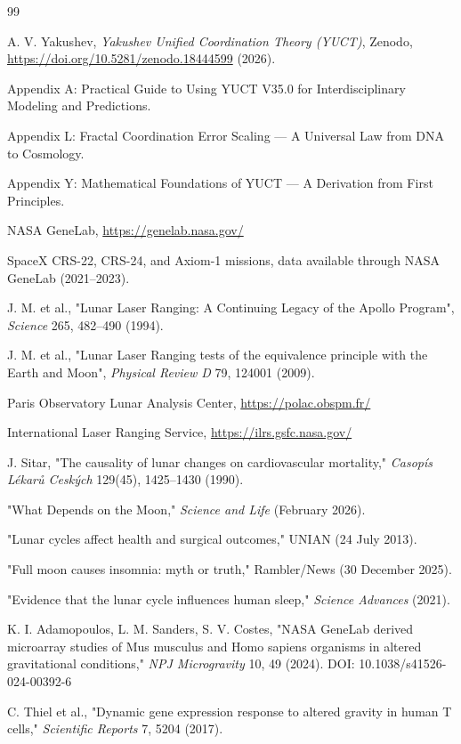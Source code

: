 \documentclass[12pt,a4paper]{article}
\theoremstyle{remark}
\begin{document}
	\begin{thebibliography}{99}
		
		A. V. Yakushev, \emph{Yakushev Unified Coordination Theory (YUCT)}, Zenodo, \url{https://doi.org/10.5281/zenodo.18444599} (2026).
		
		Appendix A: Practical Guide to Using YUCT V35.0 for Interdisciplinary Modeling and Predictions.
		
		Appendix L: Fractal Coordination Error Scaling — A Universal Law from DNA to Cosmology.
		
		Appendix Y: Mathematical Foundations of YUCT — A Derivation from First Principles.
		
		NASA GeneLab, \url{https://genelab.nasa.gov/}
		
		SpaceX CRS-22, CRS-24, and Axiom-1 missions, data available through NASA GeneLab (2021–2023).
		
		J. M. et al., "Lunar Laser Ranging: A Continuing Legacy of the Apollo Program", \emph{Science} 265, 482–490 (1994).
		
		J. M. et al., "Lunar Laser Ranging tests of the equivalence principle with the Earth and Moon", \emph{Physical Review D} 79, 124001 (2009).
		
		Paris Observatory Lunar Analysis Center, \url{https://polac.obspm.fr/}
		
		International Laser Ranging Service, \url{https://ilrs.gsfc.nasa.gov/}
		
		J. Sitar, "The causality of lunar changes on cardiovascular mortality," \emph{Casopís Lékarů Ceských} 129(45), 1425–1430 (1990).
		
		"What Depends on the Moon," \emph{Science and Life} (February 2026).
		
		"Lunar cycles affect health and surgical outcomes," UNIAN (24 July 2013).
		
		"Full moon causes insomnia: myth or truth," Rambler/News (30 December 2025).
		
		"Evidence that the lunar cycle influences human sleep," \emph{Science Advances} (2021).
		
		K. I. Adamopoulos, L. M. Sanders, S. V. Costes, "NASA GeneLab derived microarray studies of Mus musculus and Homo sapiens organisms in altered gravitational conditions," \emph{NPJ Microgravity} 10, 49 (2024). DOI: 10.1038/s41526-024-00392-6
		
		C. Thiel et al., "Dynamic gene expression response to altered gravity in human T cells," \emph{Scientific Reports} 7, 5204 (2017).
		
	\end{thebibliography}
	
\end{document}
